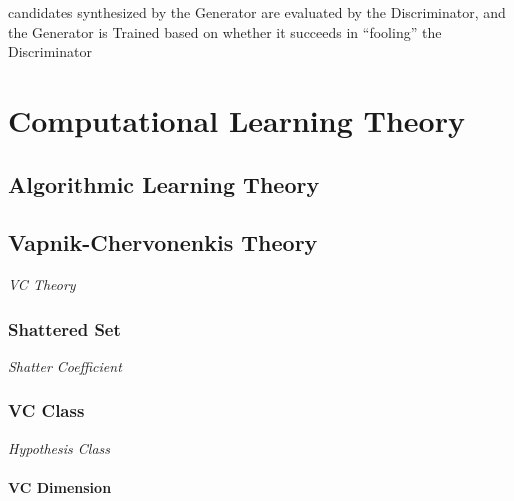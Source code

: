 candidates synthesized by the Generator are evaluated by the Discriminator, and
the Generator is Trained based on whether it succeeds in ``fooling'' the
Discriminator



\section{Computational Learning Theory}\label{sec:computational_learning_theory}




\subsection{Algorithmic Learning Theory}\label{sec:algorithmic_learning}

\subsection{Vapnik-Chervonenkis Theory}\label{sec:vc_theory}

\emph{VC Theory}



\subsubsection{Shattered Set}\label{sec:shattered_set}

\emph{Shatter Coefficient}



\subsubsection{VC Class}\label{sec:vc_class}

\emph{Hypothesis Class}



\paragraph{VC Dimension}\label{sec:vc_dimension}\hfill

